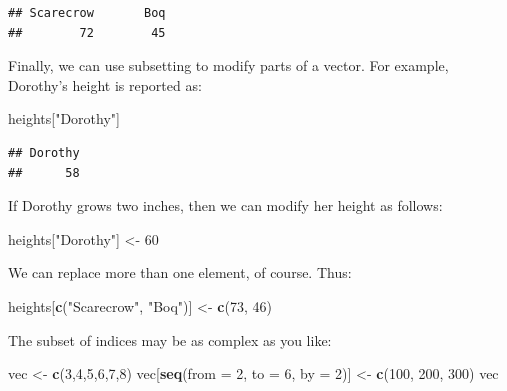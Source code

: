 \documentclass[]{book}
\makeatletter
\newenvironment{Shaded}{\begin{snugshade}}{\end{snugshade}}
\newcommand{\KeywordTok}[1]{\textcolor[rgb]{0.13,0.29,0.53}{\textbf{#1}}}
\newcommand{\DataTypeTok}[1]{\textcolor[rgb]{0.13,0.29,0.53}{#1}}
\newcommand{\DecValTok}[1]{\textcolor[rgb]{0.00,0.00,0.81}{#1}}
\newcommand{\StringTok}[1]{\textcolor[rgb]{0.31,0.60,0.02}{#1}}
\newcommand{\NormalTok}[1]{#1}
\newenvironment{kframe}{%
\medskip{}
\setlength{\fboxsep}{.8em}
 \def\at@end@of@kframe{}%
 \ifinner\ifhmode%
  \def\at@end@of@kframe{\end{minipage}}%
  \begin{minipage}{\columnwidth}%
 \fi\fi%
 \def\FrameCommand##1{\hskip\@totalleftmargin \hskip-\fboxsep
 \colorbox{shadecolor}{##1}\hskip-\fboxsep
     \hskip-\linewidth \hskip-\@totalleftmargin \hskip\columnwidth}%
 \MakeFramed {\advance\hsize-\width
   \@totalleftmargin\z@ \linewidth\hsize
   \@setminipage}}%
 {\par\unskip\endMakeFramed%
 \at@end@of@kframe}
\renewenvironment{Shaded}{\begin{kframe}}{\end{kframe}}
\theoremstyle{definition}
\theoremstyle{definition}
\theoremstyle{definition}
\theoremstyle{remark}
\makeatother
\begin{document}
\begin{verbatim}
## Scarecrow       Boq 
##        72        45
\end{verbatim}

Finally, we can use subsetting to modify parts of a vector. For example,
Dorothy's height is reported as:

\begin{Shaded}
\begin{Highlighting}[]
\NormalTok{heights[}\StringTok{"Dorothy"}\NormalTok{]}
\end{Highlighting}
\end{Shaded}

\begin{verbatim}
## Dorothy 
##      58
\end{verbatim}

If Dorothy grows two inches, then we can modify her height as follows:

\begin{Shaded}
\begin{Highlighting}[]
\NormalTok{heights[}\StringTok{"Dorothy"}\NormalTok{] <-}\StringTok{ }\DecValTok{60}
\end{Highlighting}
\end{Shaded}

We can replace more than one element, of course. Thus:

\begin{Shaded}
\begin{Highlighting}[]
\NormalTok{heights[}\KeywordTok{c}\NormalTok{(}\StringTok{"Scarecrow"}\NormalTok{, }\StringTok{"Boq"}\NormalTok{)] <-}\StringTok{ }\KeywordTok{c}\NormalTok{(}\DecValTok{73}\NormalTok{, }\DecValTok{46}\NormalTok{)}
\end{Highlighting}
\end{Shaded}

The subset of indices may be as complex as you like:

\begin{Shaded}
\begin{Highlighting}[]
\NormalTok{vec <-}\StringTok{ }\KeywordTok{c}\NormalTok{(}\DecValTok{3}\NormalTok{,}\DecValTok{4}\NormalTok{,}\DecValTok{5}\NormalTok{,}\DecValTok{6}\NormalTok{,}\DecValTok{7}\NormalTok{,}\DecValTok{8}\NormalTok{)}
\NormalTok{vec[}\KeywordTok{seq}\NormalTok{(}\DataTypeTok{from =} \DecValTok{2}\NormalTok{, }\DataTypeTok{to =} \DecValTok{6}\NormalTok{, }\DataTypeTok{by =} \DecValTok{2}\NormalTok{)] <-}\StringTok{ }\KeywordTok{c}\NormalTok{(}\DecValTok{100}\NormalTok{, }\DecValTok{200}\NormalTok{, }\DecValTok{300}\NormalTok{)}
\NormalTok{vec}
\end{Highlighting}
\end{Shaded}
\end{document}
